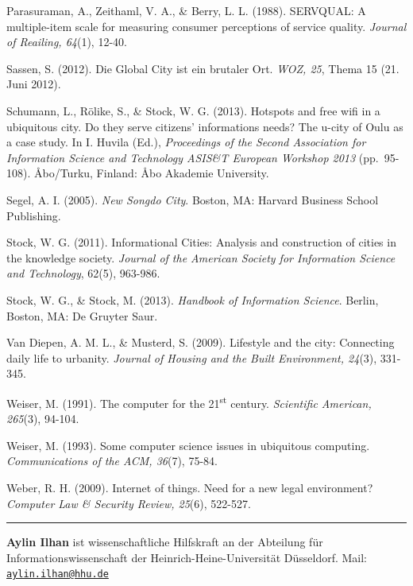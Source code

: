 \documentclass[a4paper,
fontsize=11pt,
oneside,
numbers=noperiodatend,
parskip=half-,
bibliography=totoc,
final
]{scrartcl}
\begin{document}
Parasuraman, A., Zeithaml, V. A., \& Berry, L. L. (1988). SERVQUAL: A
multiple-item scale for measuring consumer perceptions of service
quality. \emph{Journal of Reailing, 64}(1), 12-40.

Sassen, S. (2012). Die Global City ist ein brutaler Ort. \emph{WOZ, 25},
Thema 15 (21. Juni 2012).

Schumann, L., Rölike, S., \& Stock, W. G. (2013). Hotspots and free wifi
in a ubiquitous city. Do they serve citizens' informations needs? The
u-city of Oulu as a case study. In I. Huvila (Ed.), \emph{Proceedings of
the Second Association for Information Science and Technology ASIS\&T
European Workshop 2013} (pp.~95-108). Åbo/Turku, Finland: Åbo Akademie
University.

Segel, A. I. (2005). \emph{New Songdo City}. Boston, MA: Harvard
Business School Publishing.

Stock, W. G. (2011). Informational Cities: Analysis and construction of
cities in the knowledge society. \emph{Journal of the American Society
for Information Science and Technology}, 62(5), 963-986.

Stock, W. G., \& Stock, M. (2013). \emph{Handbook of Information
Science}. Berlin, Boston, MA: De Gruyter Saur.

Van Diepen, A. M. L., \& Musterd, S. (2009). Lifestyle and the city:
Connecting daily life to urbanity. \emph{Journal of Housing and the
Built Environment, 24}(3), 331-345.

Weiser, M. (1991). The computer for the 21\textsuperscript{st} century.
\emph{Scientific American, 265}(3), 94-104.

Weiser, M. (1993). Some computer science issues in ubiquitous computing.
\emph{Communications of the ACM, 36}(7), 75-84.

Weber, R. H. (2009). Internet of things. Need for a new legal
environment? \emph{Computer Law \& Security Review, 25}(6), 522-527.

\begin{center}\rule{0.5\linewidth}{\linethickness}\end{center}

\textbf{Aylin Ilhan} ist wissenschaftliche Hilfskraft an der Abteilung
für Informationswissenschaft der Heinrich-Heine-Universität Düsseldorf.
Mail: \href{mailto:aylin.ilhan@hhu.de}{\nolinkurl{aylin.ilhan@hhu.de}}
\end{document}
